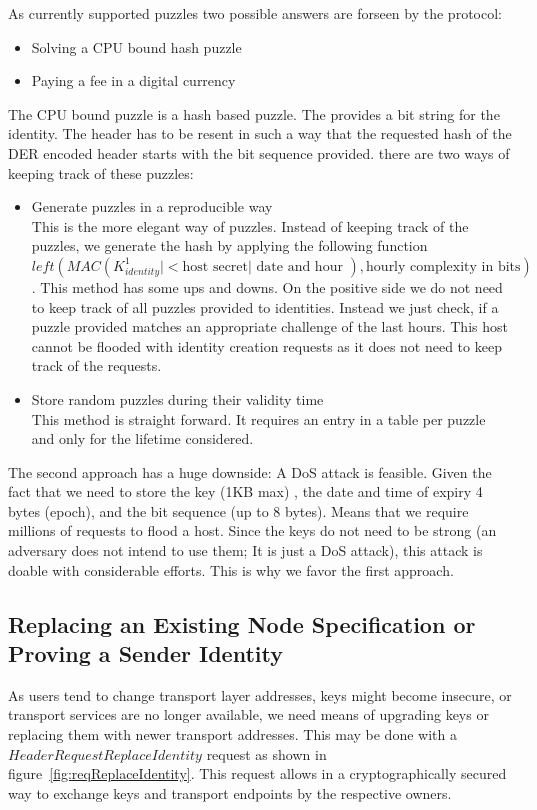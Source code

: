 As currently supported puzzles two possible answers are forseen by the protocol:
\begin{itemize}
	\item Solving a CPU bound hash puzzle 
	\item Paying a fee in a digital currency
\end{itemize}

The CPU bound puzzle is a hash based puzzle. The \VortexNode{} provides a bit string for the identity. The header has to be resent in such a way that the requested hash of the DER encoded header starts with the bit sequence provided. there are two ways of keeping track of these puzzles:

\begin{itemize}
	\item Generate puzzles in a reproducible way\\
	      This is the more elegant way of puzzles. Instead of keeping track of the puzzles, we generate the hash by applying the following function $left(MAC(K^1_{identity} | <\text{host secret} | \text{ date and hour }),\text{hourly complexity in bits})$. This method has some ups and downs. On the positive side we do not need to keep track of all puzzles provided to identities. Instead we just check, if a puzzle provided matches an appropriate challenge of the last hours. This host cannot be flooded with identity creation requests as it does not need to keep track of the requests.
	\item Store random puzzles during their validity time\\
	      This method is straight forward. It requires an entry in a table per puzzle and only for the lifetime considered. 
\end{itemize}

The second approach has a huge downside: A DoS attack is feasible. Given the fact that we need to store the key (1KB max) , the date and time of expiry 4 bytes (epoch), and the bit sequence (up to 8 bytes). Means that we require millions of requests to flood a host. Since the keys do not need to be strong (an adversary does not intend to use them; It is just a DoS attack), this attack is doable with considerable efforts. This is why we favor the first approach.

\subsection{Replacing an Existing Node Specification or Proving a Sender Identity\label{sec:replaceID}}
As users tend to change transport layer addresses, keys might become insecure, or transport services are no longer available, we need means of upgrading keys or replacing them with newer transport addresses. This may be done with a $HeaderRequestReplaceIdentity$ request as shown in figure~\ref{fig:reqReplaceIdentity}. This request allows in a cryptographically secured way to exchange keys and transport endpoints by the respective owners.

